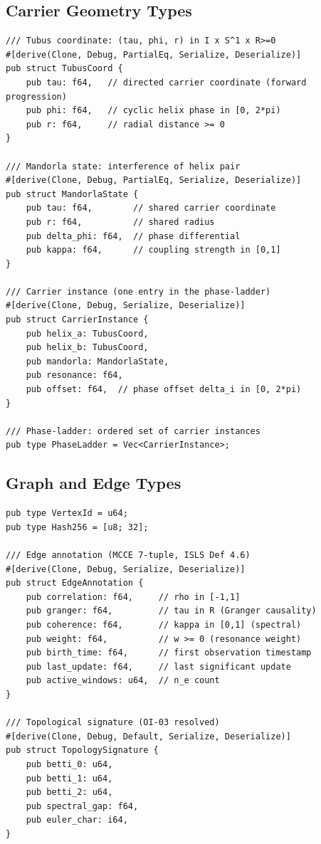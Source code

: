 \documentclass[10pt,a4paper]{article}
\theoremstyle{definition}\newtheorem{definition}{Def}[section]
\theoremstyle{plain}\newtheorem{theorem}{Thm}[section]
\begin{document}
\subsection{Carrier Geometry Types}

\begin{lstlisting}[style=rust]
/// Tubus coordinate: (tau, phi, r) in I x S^1 x R>=0
#[derive(Clone, Debug, PartialEq, Serialize, Deserialize)]
pub struct TubusCoord {
    pub tau: f64,   // directed carrier coordinate (forward progression)
    pub phi: f64,   // cyclic helix phase in [0, 2*pi)
    pub r: f64,     // radial distance >= 0
}

/// Mandorla state: interference of helix pair
#[derive(Clone, Debug, PartialEq, Serialize, Deserialize)]
pub struct MandorlaState {
    pub tau: f64,        // shared carrier coordinate
    pub r: f64,          // shared radius
    pub delta_phi: f64,  // phase differential
    pub kappa: f64,      // coupling strength in [0,1]
}

/// Carrier instance (one entry in the phase-ladder)
#[derive(Clone, Debug, Serialize, Deserialize)]
pub struct CarrierInstance {
    pub helix_a: TubusCoord,
    pub helix_b: TubusCoord,
    pub mandorla: MandorlaState,
    pub resonance: f64,
    pub offset: f64,  // phase offset delta_i in [0, 2*pi)
}

/// Phase-ladder: ordered set of carrier instances
pub type PhaseLadder = Vec<CarrierInstance>;
\end{lstlisting}

\subsection{Graph and Edge Types}

\begin{lstlisting}[style=rust]
pub type VertexId = u64;
pub type Hash256 = [u8; 32];

/// Edge annotation (MCCE 7-tuple, ISLS Def 4.6)
#[derive(Clone, Debug, Serialize, Deserialize)]
pub struct EdgeAnnotation {
    pub correlation: f64,     // rho in [-1,1]
    pub granger: f64,         // tau in R (Granger causality)
    pub coherence: f64,       // kappa in [0,1] (spectral)
    pub weight: f64,          // w >= 0 (resonance weight)
    pub birth_time: f64,      // first observation timestamp
    pub last_update: f64,     // last significant update
    pub active_windows: u64,  // n_e count
}

/// Topological signature (OI-03 resolved)
#[derive(Clone, Debug, Default, Serialize, Deserialize)]
pub struct TopologySignature {
    pub betti_0: u64,
    pub betti_1: u64,
    pub betti_2: u64,
    pub spectral_gap: f64,
    pub euler_char: i64,
}
\end{lstlisting}
\end{document}
